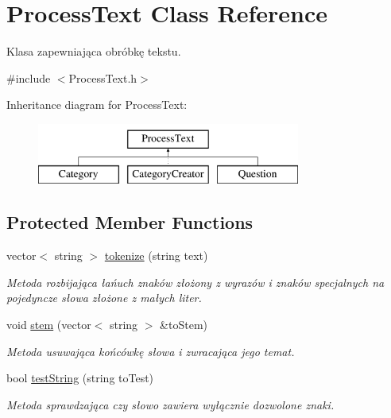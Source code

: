 \hypertarget{class_process_text}{}\section{Process\+Text Class Reference}
\label{class_process_text}


Klasa zapewniająca obróbkę tekstu.  




{\ttfamily \#include $<$Process\+Text.\+h$>$}

Inheritance diagram for Process\+Text\+:\begin{figure}[H]
\begin{center}
\leavevmode
\includegraphics[height=2.000000cm]{class_process_text}
\end{center}
\end{figure}
\subsection*{Protected Member Functions}
\begin{DoxyCompactItemize}
\item 
vector$<$ string $>$ \mbox{\hyperlink{class_process_text_a0ed75725009127382c8fec550a139ba8}{tokenize}} (string text)
\begin{DoxyCompactList}\small\item\em Metoda rozbijająca łańuch znaków złożony z wyrazów i znaków specjalnych na pojedyncze słowa złożone z małych liter. \end{DoxyCompactList}\item 
void \mbox{\hyperlink{class_process_text_a54127c710af4a6539544e1d347075acf}{stem}} (vector$<$ string $>$ \&to\+Stem)
\begin{DoxyCompactList}\small\item\em Metoda usuwająca końcówkę słowa i zwracająca jego temat. \end{DoxyCompactList}\item 
bool \mbox{\hyperlink{class_process_text_ada619b70f0cbcc68862fb329f42db958}{test\+String}} (string to\+Test)
\begin{DoxyCompactList}\small\item\em Metoda sprawdzająca czy słowo zawiera wyłącznie dozwolone znaki. \end{DoxyCompactList}\end{DoxyCompactItemize}


